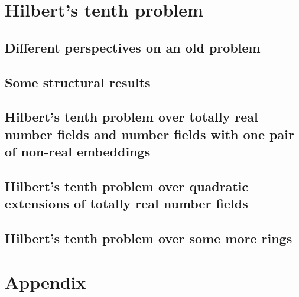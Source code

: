 \documentclass[12pt,a4paper]{scrbook}
\numberwithin{equation}{section}
\begin{document}
\chapter{Hilbert's tenth problem}

\section{Different perspectives on an old problem}


\section{Some structural results}


\section[\textsc{H10} over totally real number fields or fields with one  pair of conjugate embeddings]{Hilbert's tenth problem over totally real number fields and number fields with one pair of non-real embeddings}


\section{Hilbert's tenth problem over quadratic extensions of totally real number fields}


\section{Hilbert's tenth problem over some more rings}


\clearpage
\appendix
\chapter{Appendix}\label{sec:Appendix}


\backmatter
\vspace{\fill}
\printbibliography

\listoftodos
\end{document}
